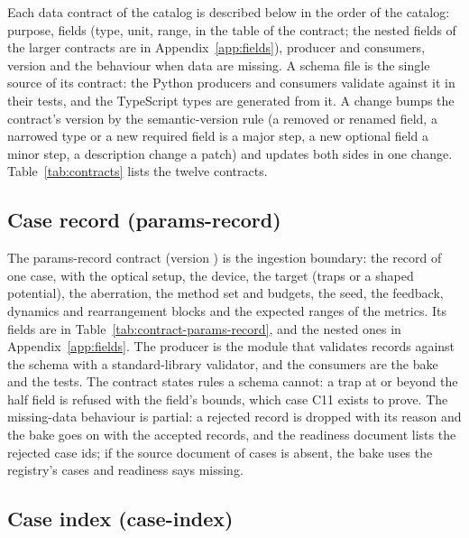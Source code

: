 Each data contract of the catalog is described below in the order of the catalog: purpose, fields (type, unit, range, in the table of the contract; the nested fields of the larger contracts are in Appendix~\ref{app:fields}), producer and consumers, version and the behaviour when data are missing. A schema file is the single source of its contract: the Python producers and consumers validate against it in their tests, and the TypeScript types are generated from it. A change bumps the contract's version by the semantic-version rule (a removed or renamed field, a narrowed type or a new required field is a major step, a new optional field a minor step, a description change a patch) and updates both sides in one change. Table~\ref{tab:contracts} lists the twelve contracts.



\subsection{Case record (params-record)}\label{sec:data-params-record}

The params-record contract (version ) is the ingestion boundary: the record of one case, with the optical setup, the device, the target (traps or a shaped potential), the aberration, the method set and budgets, the seed, the feedback, dynamics and rearrangement blocks and the expected ranges of the metrics. Its fields are in Table~\ref{tab:contract-params-record}, and the nested ones in Appendix~\ref{app:fields}. The producer is the module that validates records against the schema with a standard-library validator, and the consumers are the bake and the tests. The contract states rules a schema cannot: a trap at or beyond the half field is refused with the field's bounds, which case C11 exists to prove. The missing-data behaviour is partial: a rejected record is dropped with its reason and the bake goes on with the accepted records, and the readiness document lists the rejected case ids; if the source document of cases is absent, the bake uses the registry's cases and readiness says missing.



\subsection{Case index (case-index)}\label{sec:data-case-index}

